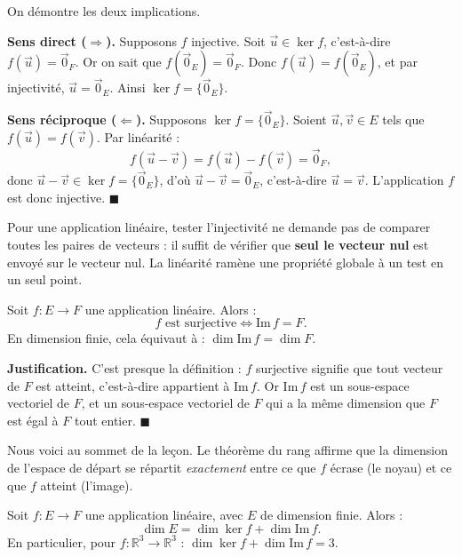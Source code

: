 \documentclass[11pt]{article}
\newcounter{popsec}
\newcounter{popsub}
\newcommand{\courssub}[1]{%
  \stepcounter{popsub}%
  \par\vspace{9pt}\noindent{\popxbold\fontsize{11.5}{13}\selectfont\color{popink}{\color{poporange}\thepopsec.\thepopsub}\hspace{6pt}#1}\par\nopagebreak\vspace{4pt}
}
\begin{document}
\begin{experience}
On démontre les deux implications.

\textbf{Sens direct ($\Rightarrow$).} Supposons $f$ injective. Soit $\vec{u} \in \ker f$, c'est-à-dire $f(\vec{u}) = \vec{0}_F$. Or on sait que $f(\vec{0}_E) = \vec{0}_F$. Donc $f(\vec{u}) = f(\vec{0}_E)$, et par injectivité, $\vec{u} = \vec{0}_E$. Ainsi $\ker f = \{\vec{0}_E\}$.

\textbf{Sens réciproque ($\Leftarrow$).} Supposons $\ker f = \{\vec{0}_E\}$. Soient $\vec{u}, \vec{v} \in E$ tels que $f(\vec{u}) = f(\vec{v})$. Par linéarité :
\[
f(\vec{u} - \vec{v}) = f(\vec{u}) - f(\vec{v}) = \vec{0}_F,
\]
donc $\vec{u} - \vec{v} \in \ker f = \{\vec{0}_E\}$, d'où $\vec{u} - \vec{v} = \vec{0}_E$, c'est-à-dire $\vec{u} = \vec{v}$. L'application $f$ est donc injective. \hfill$\blacksquare$
\end{experience}

\begin{aretenir}
Pour une application linéaire, tester l'injectivité ne demande pas de comparer toutes les paires de vecteurs : il suffit de vérifier que \textbf{seul le vecteur nul} est envoyé sur le vecteur nul. La linéarité ramène une propriété globale à un test en un seul point.
\end{aretenir}

\begin{propriete}
Soit $f : E \to F$ une application linéaire. Alors :
\[
f \text{ est surjective} \iff \mathrm{Im}\, f = F.
\]
En dimension finie, cela équivaut à : $\dim \mathrm{Im}\, f = \dim F$.
\end{propriete}

\textbf{Justification.} C'est presque la définition : $f$ surjective signifie que tout vecteur de $F$ est atteint, c'est-à-dire appartient à $\mathrm{Im}\, f$. Or $\mathrm{Im}\, f$ est un sous-espace vectoriel de $F$, et un sous-espace vectoriel de $F$ qui a la même dimension que $F$ est égal à $F$ tout entier. \hfill$\blacksquare$

\courssub{Le théorème du rang}

Nous voici au sommet de la leçon. Le théorème du rang affirme que la dimension de l'espace de départ se répartit \emph{exactement} entre ce que $f$ écrase (le noyau) et ce que $f$ atteint (l'image).

\begin{propriete}
Soit $f : E \to F$ une application linéaire, avec $E$ de dimension finie. Alors :
\[
\dim E = \dim \ker f + \dim \mathrm{Im}\, f.
\]
En particulier, pour $f : \mathbb{R}^3 \to \mathbb{R}^3$ : $\dim \ker f + \dim \mathrm{Im}\, f = 3$.
\end{propriete}
\end{document}
